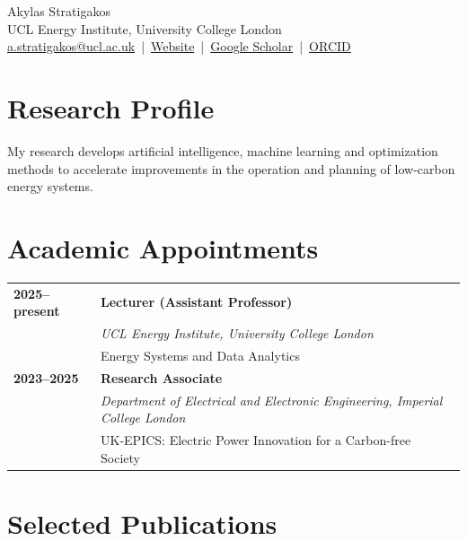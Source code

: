 \documentclass[10pt,a4paper]{article}
\makeatletter
\newlength{\datecolwidth}
\newenvironment{entrylist}{%
  \begin{longtable}{@{}p{\datecolwidth}@{\hspace{0.7em}}p{\dimexpr\linewidth-\datecolwidth-0.7em\relax}@{}}%
}{\end{longtable}}
\newcommand{\entry}[4]{%
  \textbf{#1} & \textbf{#2}\\[-0.25em]
  & {\itshape #3}\\[-0.25em]
  & #4\\[0.35em]
}
\newcommand{\name}{Akylas Stratigakos}
\newcommand{\emailaddr}{a.stratigakos@ucl.ac.uk}
\newcommand{\website}{https://akylasstrat.github.io}
\newcommand{\scholar}{https://scholar.google.com/citations?user=RBrai44AAAAJ\&hl=en}
\newcommand{\orcid}{https://orcid.org/0000-0002-9954-5558}
\makeatother
\begin{document}
\begin{center}
  {\LARGE \name}\\[1pt]
  UCL Energy Institute, University College London\\[3pt]
  \href{mailto:\emailaddr}{\emailaddr} \,|\, \href{\website}{Website} \,|\,
  \href{\scholar}{Google Scholar} \,|\, \href{\orcid}{ORCID}
\end{center}

\section*{Research Profile}
My research develops artificial intelligence, machine learning and optimization methods to accelerate
improvements in the operation and planning of low-carbon energy systems.

\section*{Academic Appointments}
\begin{entrylist}
  \entry{2025--present}{Lecturer (Assistant Professor)}{UCL Energy Institute, University College London}{Energy Systems and Data Analytics}
  \entry{2023--2025}{Research Associate}{Department of Electrical and Electronic Engineering, Imperial College London}{UK-EPICS: Electric Power Innovation for a Carbon-free Society}
\end{entrylist}

\section*{Selected Publications}
\nocite{vancaelenberg2026network,delavarga2026pseudomeasurement,vancaelenberg2026constructing,stratigakos2025adaptive,stratigakos2024combination,stratigakos2024interpretable,stratigakos2022prescriptive}
\printbibliography[heading=none]
\end{document}
